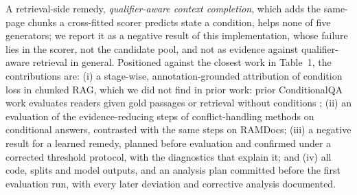A retrieval-side remedy, \emph{qualifier-aware context completion}, which adds the same-page chunks a cross-fitted scorer predicts state a condition, helps none of five generators; we report it as a negative result of this implementation, whose failure lies in the scorer, not the candidate pool, and not as evidence against qualifier-aware retrieval in general. Positioned against the closest work in Table~1, the contributions are: (i) a stage-wise, annotation-grounded attribution of condition loss in chunked RAG, which we did not find in prior work: prior ConditionalQA work evaluates readers given gold passages \cite{lin2024chaincondition} or retrieval without conditions \cite{wan2026retrieverfree}; (ii) an evaluation of the evidence-reducing steps of conflict-handling methods on conditional answers, contrasted with the same steps on RAMDocs; (iii) a negative result for a learned remedy, planned before evaluation and confirmed under a corrected threshold protocol, with the diagnostics that explain it; and (iv) all code, splits and model outputs, and an analysis plan committed before the first evaluation run, with every later deviation and corrective analysis documented.
